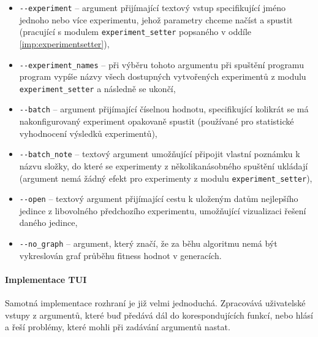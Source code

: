 \begin{itemize}
    \item \texttt{-{}-experiment} -- argument přijímající textový vstup
        specifikující jméno jednoho nebo více experimentu, jehož
        parametry chceme načíst a spustit (pracující s modulem
        \texttt{experiment\_setter} popsaného v oddíle
        \ref{imp:experimentsetter}),
    \item \texttt{-{}-experiment\_names} -- při výběru tohoto argumentu při
        spuštění programu program vypíše názvy všech dostupných vytvořených
        experimentů z modulu \texttt{experiment\_setter} a následně se ukončí,
    \item \texttt{-{}-batch} -- argument přijímající číselnou hodnotu,
        specifikující kolikrát se má nakonfigurovaný experiment opakovaně
        spustit (používané pro statistické vyhodnocení výsledků experimentů),
    \item \texttt{-{}-batch\_note} -- textový argument umožňující připojit
        vlastní poznámku k názvu složky, do které se experimenty z
        několikanásobného spuštění ukládají (argument nemá žádný efekt pro
        experimenty z modulu \texttt{experiment\_setter}),
    \item \texttt{-{}-open} -- textový argument přijímající cestu k uloženým
        datům nejlepšího jedince z libovolného předchozího experimentu,
        umožňující vizualizaci řešení daného jedince,
    \item \texttt{-{}-no\_graph} -- argument, který značí, že za běhu algoritmu
        nemá být vykreslován graf průběhu fitness hodnot v
        generacích.
\end{itemize}

\paragraph{Implementace TUI}
Samotná implementace rozhraní je již velmi jednoduchá. Zpracovává uživatelské
vstupy z argumentů, které buď předává dál do korespondujících funkcí, nebo
hlásí a řeší problémy, které mohli při zadávání argumentů nastat.
